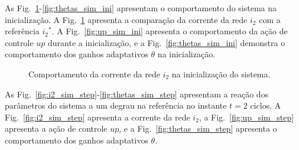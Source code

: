   As Fig.~\ref{fig:i2_sim_ini}-\ref{fig:thetas_sim_ini} apresentam o comportamento do sistema na inicialização. A Fig.~\ref{fig:i2_sim_ini} apresenta a comparação da corrente da rede $i_2$ com a referência ${i_2}^*$. A Fig.~\ref{fig:up_sim_ini} apresenta o comportamento da ação de controle $up$ durante a inicialização, e a Fig.~\ref{fig:thetas_sim_ini} demonstra o comportamento dos ganhos adaptativos $\theta$ na inicialização.


	\begin{figure}[!htb]
    \centering
      \def\svgwidth{\textwidth}
      
    \renewcommand\figurename{Fig.}
    \caption{Comportamento da corrente da rede $i_2$ na inicialização do sistema.}
    \label{fig:i2_sim_ini}
  \end{figure}

  \newpage

  \vfill
  \noindent
  \begin{minipage}{\textwidth}
    \makebox[\textwidth]{
      \centering
      \def\svgwidth{\textwidth}
      }
    \label{fig:up_sim_ini}
  \end{minipage}

  \vfill
  \noindent
  \begin{minipage}{\textwidth}
    \makebox[\textwidth]{
      \centering
      \def\svgwidth{\textwidth}
      }
    \label{fig:thetas_sim_ini}
  \end{minipage}

  \newpage

  As Fig.~\ref{fig:i2_sim_step}-\ref{fig:thetas_sim_step} apresentam a reação dos parâmetros do sistema a um degrau na referência no instante $t=2$ ciclos. A Fig.~\ref{fig:i2_sim_step} apresenta a corrente da rede $i_2$, a Fig.~\ref{fig:up_sim_step} apresenta a ação de controle $up$, e a Fig.~\ref{fig:thetas_sim_step} apresenta o comportamento dos ganhos adaptativos $\theta$.

  \vfill
  \noindent
  \begin{minipage}{\textwidth}
    \makebox[\textwidth]{
      \centering
      \def\svgwidth{\textwidth}
      }
    \label{fig:i2_sim_step}
  \end{minipage}

